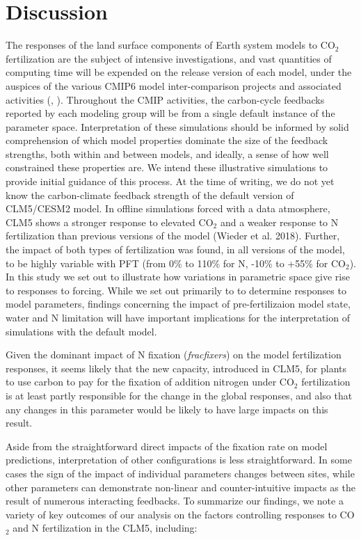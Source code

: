 \documentclass[draft,linenumbers]{agujournal}
\begin{document}
\section{Discussion}
The responses of the land surface components of Earth system models to CO$_{2}$ fertilization are the subject of intensive investigations, and vast quantities of computing time will be expended on the release version of each model, under the auspices of the various CMIP6 model inter-comparison projects and associated activities (\cite{meehl2014}, \cite{eyring2016}). Throughout the CMIP activities, the carbon-cycle feedbacks reported by each modeling group will be from a single default instance of the parameter space. Interpretation of these simulations should be informed by solid comprehension of which model properties dominate the size of the feedback strengths,  both within and between models, and ideally, a sense of how well constrained these properties are. We intend these illustrative simulations to provide initial guidance of this process. 
At the time of writing, we do not yet know the carbon-climate feedback strength of the default version of CLM5/CESM2 model. In offline simulations forced with a data atmosphere, CLM5 shows a stronger response to elevated CO$_{2}$ and a weaker response to N fertilization than previous versions of the model (Wieder et al. 2018). Further, the impact of both types of fertilization was found, in all versions of the model, to be highly variable with PFT (from 0\% to 110\% for N, -10\% to +55\% for CO$_{2}$). In this study we set out to illustrate how variations in parametric space give rise to responses to forcing. While we set out primarily to to determine responses to model parameters, findings concerning the impact of pre-fertilizaion model state, water and N limitation will have important implications for the interpretation of simulations with the default model. 

Given the dominant impact of N fixation (\emph{fracfixers}) on the model fertilization responses, it seems likely that the new capacity, introduced in CLM5, for plants to use carbon to pay for the fixation of addition nitrogen under CO$_{2}$ fertilization is at least partly responsible for the change in the global responses, and also that any changes in this parameter would be likely to have large impacts on this result. 

Aside from the straightforward direct impacts of the fixation rate on model predictions, interpretation of other configurations is less straightforward.  In some cases the sign of the impact of individual parameters changes between sites, while other parameters can demonstrate non-linear and counter-intuitive impacts as the result of numerous interacting feedbacks.  To summarize our findings, we note a variety of key outcomes of our analysis on the factors controlling responses to CO$_{2}$ and N fertilization in the CLM5, including:
\end{document}
